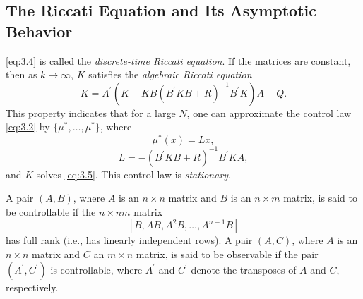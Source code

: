 \subsection*{The Riccati Equation and Its Asymptotic Behavior}
\cref{eq:3.4} is called the \textit{discrete-time Riccati equation}. If the matrices are constant, then as $k\rightarrow\infty$, $K$ satisfies the \textit{algebraic Riccati equation}
\begin{equation}\label{eq:3.5}
    K = A^\prime (K - KB(B^\prime K B + R)^{ - 1}B^\prime K)A + Q.
\end{equation}
This property indicates that for a large $N$, one can approximate the control law \cref{eq:3.2} by $\{\mu^*,\dots,\mu^*\}$, where
\begin{equation}
    \mu^*(x) = L x,
\end{equation}
\[L = -(B^\prime K B + R)^{ - 1}B^\prime K A,\] and $K$ solves \cref{eq:3.5}. This control law is \textit{stationary}.
\begin{definition}
    A pair $(A, B)$, where $A$ is an $n \times n$ matrix
    and $B$ is an $n \times m$ matrix, is said to be controllable if the $n
    \times n m$ matrix \[ \left[B, A B, A^2 B, \ldots, A^{n-1} B\right] \] has
    full rank (i.e., has linearly independent rows). A pair $(A, C)$, where $A$
    is an $n \times n$ matrix and $C$ an $m \times n$ matrix, is said to be
    observable if the pair $\left(A^{\prime}, C^{\prime}\right)$ is controllable,
    where $A^{\prime}$ and $C^{\prime}$ denote the transposes of $A$ and $C$,
    respectively.
\end{definition}
